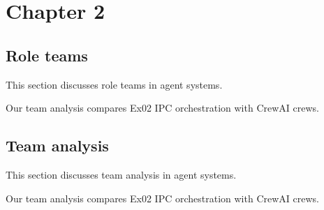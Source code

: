 \section{Chapter 2}

\subsection{Role teams}
This section discusses role teams in agent systems. \cite{crewai2024}

Our team analysis compares Ex02 IPC orchestration with CrewAI crews. \cite{crewai2024}

\subsection{Team analysis}
This section discusses team analysis in agent systems. \cite{crewai2024}

Our team analysis compares Ex02 IPC orchestration with CrewAI crews. \cite{crewai2024}
